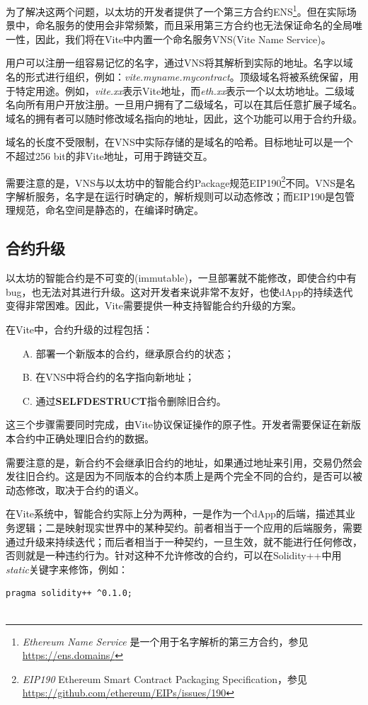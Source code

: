 \documentclass[UTF8,nofonts]{ctexart}
\begin{document}
\begin{multicols}{2}
为了解决这两个问题，以太坊的开发者提供了一个第三方合约ENS\footnote{\textit{Ethereum Name Service} 是一个用于名字解析的第三方合约，参见 \url{https://ens.domains/}}。但在实际场景中，命名服务的使用会非常频繁，而且采用第三方合约也无法保证命名的全局唯一性，因此，我们将在Vite中内置一个命名服务VNS(Vite Name Service)。

用户可以注册一组容易记忆的名字，通过VNS将其解析到实际的地址。名字以域名的形式进行组织，例如：\textit{vite.myname.mycontract}。顶级域名将被系统保留，用于特定用途。例如，\textit{vite.xx}表示Vite地址，而\textit{eth.xx}表示一个以太坊地址。二级域名向所有用户开放注册。一旦用户拥有了二级域名，可以在其后任意扩展子域名。域名的拥有者可以随时修改域名指向的地址，因此，这个功能可以用于合约升级。

域名的长度不受限制，在VNS中实际存储的是域名的哈希。目标地址可以是一个不超过256 bit的非Vite地址，可用于跨链交互。

需要注意的是，VNS与以太坊中的智能合约Package规范EIP190\footnote{\textit{EIP190} Ethereum Smart Contract Packaging Specification，参见 \url{https://github.com/ethereum/EIPs/issues/190}}不同。VNS是名字解析服务，名字是在运行时确定的，解析规则可以动态修改；而EIP190是包管理规范，命名空间是静态的，在编译时确定。

\subsection{合约升级}
以太坊的智能合约是不可变的(immutable)，一旦部署就不能修改，即使合约中有bug，也无法对其进行升级。这对开发者来说非常不友好，也使dApp的持续迭代变得非常困难。因此，Vite需要提供一种支持智能合约升级的方案。

在Vite中，合约升级的过程包括：
\begin{itemize}
	\item[A.] 部署一个新版本的合约，继承原合约的状态；
	\item[B.] 在VNS中将合约的名字指向新地址；
	\item[C.] 通过\textbf{SELFDESTRUCT}指令删除旧合约。
\end{itemize}

这三个步骤需要同时完成，由Vite协议保证操作的原子性。开发者需要保证在新版本合约中正确处理旧合约的数据。

需要注意的是，新合约不会继承旧合约的地址，如果通过地址来引用，交易仍然会发往旧合约。这是因为不同版本的合约本质上是两个完全不同的合约，是否可以被动态修改，取决于合约的语义。

在Vite系统中，智能合约实际上分为两种，一是作为一个dApp的后端，描述其业务逻辑；二是映射现实世界中的某种契约。前者相当于一个应用的后端服务，需要通过升级来持续迭代；而后者相当于一种契约，一旦生效，就不能进行任何修改，否则就是一种违约行为。针对这种不允许修改的合约，可以在Solidity++中用\textit{static}关键字来修饰，例如：
\begin{verbatim}
pragma solidity++ ^0.1.0;


\end{verbatim}
\end{multicols}
\end{document}
